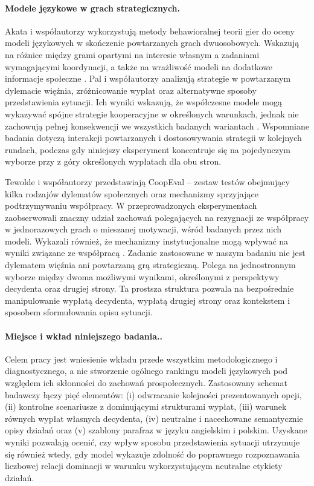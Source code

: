 \documentclass[11pt]{article}
\begin{document}
\paragraph{Modele językowe w grach strategicznych.}
Akata i współautorzy wykorzystują metody behawioralnej teorii gier do oceny modeli językowych w skończenie powtarzanych grach dwuosobowych. Wskazują na różnice między grami opartymi na interesie własnym a zadaniami wymagającymi koordynacji, a także na wrażliwość modeli na dodatkowe informacje społeczne \citep{akata2025repeated}. Pal i współautorzy analizują strategie w powtarzanym dylemacie więźnia, zróżnicowanie wypłat oraz alternatywne sposoby przedstawienia sytuacji. Ich wyniki wskazują, że współczesne modele mogą wykazywać spójne strategie kooperacyjne w określonych warunkach, jednak nie zachowują pełnej konsekwencji we wszystkich badanych wariantach \citep{pal2026robust}. Wspomniane badania dotyczą interakcji powtarzanych i dostosowywania strategii w kolejnych rundach, podczas gdy niniejszy eksperyment koncentruje się na pojedynczym wyborze przy z góry określonych wypłatach dla obu stron.

Tewolde i współautorzy przedstawiają CoopEval – zestaw testów obejmujący kilka rodzajów dylematów społecznych oraz mechanizmy sprzyjające podtrzymywaniu współpracy. W przeprowadzonych eksperymentach zaobserwowali znaczny udział zachowań polegających na rezygnacji ze współpracy w jednorazowych grach o mieszanej motywacji, wśród badanych przez nich modeli. Wykazali również, że mechanizmy instytucjonalne mogą wpływać na wyniki związane ze współpracą \citep{tewolde2026coopeval}. Zadanie zastosowane w naszym badaniu nie jest dylematem więźnia ani powtarzaną grą strategiczną. Polega na jednostronnym wyborze między dwoma możliwymi wynikami, określonymi z perspektywy decydenta oraz drugiej strony. Ta prostsza struktura pozwala na bezpośrednie manipulowanie wypłatą decydenta, wypłatą drugiej strony oraz kontekstem i sposobem sformułowania opisu sytuacji.

\paragraph{Miejsce i wkład niniejszego badania..}
Celem pracy jest wniesienie wkładu przede wszystkim metodologicznego i diagnostycznego, a nie stworzenie ogólnego rankingu modeli językowych pod względem ich skłonności do zachowań prospołecznych. Zastosowany schemat badawczy łączy pięć elementów: 
(i) odwracanie kolejności prezentowanych opcji, (ii) kontrolne scenariusze z dominującymi strukturami wypłat, (iii) warunek równych wypłat własnych decydenta, (iv) neutralne i nacechowane semantycznie opisy działań oraz (v) szablony parafraz w języku angielskim i polskim. Uzyskane wyniki pozwalają ocenić, czy wpływ sposobu przedstawienia sytuacji utrzymuje się również wtedy, gdy model wykazuje zdolność do poprawnego rozpoznawania liczbowej relacji dominacji w warunku wykorzystującym neutralne etykiety działań.
\end{document}
